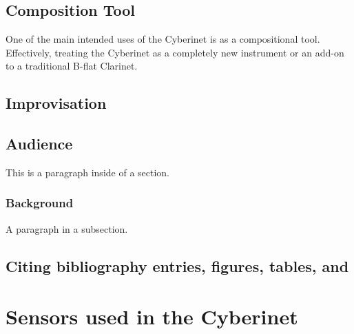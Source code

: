 \section{Composition Tool}
One of the main intended uses of the Cyberinet is as a compositional tool. Effectively, treating the Cyberinet as a completely new instrument or an add-on to a traditional B-flat Clarinet.

\section{Improvisation}



\section{Audience}

This is a paragraph inside of a section.

\subsection{Background}
\label{sec:background}

A paragraph in a subsection.

\section{Citing bibliography entries, figures, tables, and }



\chapter{Sensors used in the Cyberinet}

